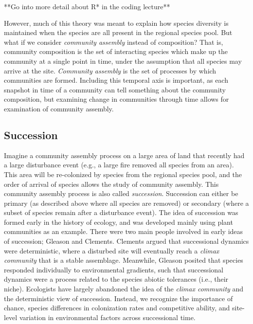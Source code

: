 \documentclass[12pt]{article}
\begin{document}
**Go into more detail about R* in the coding lecture**


However, much of this theory was meant to explain how species diversity is maintained when the species are all present in the regional species pool. But what if we consider \textit{community assembly} instead of composition? That is, community composition is the set of interacting species which make up the community at a single point in time, under the assumption that all species may arrive at the site. \textit{Community assembly} is the set of processes by which communities are formed. Including this temporal axis is important, as each snapshot in time of a community can tell something about the community composition, but examining change in communities through time allows for examination of community assembly. 











\clearpage
\subsection*{Succession}
Imagine a community assembly process on a large area of land that recently had a large disturbance event (e.g., a large fire removed all species from an area). This area will be re-colonized by species from the regional species pool, and the order of arrival of species allows the study of community assembly. This community assembly process is also called \textit{succession}. Succession can either be primary (as described above where all species are removed) or secondary (where a subset of species remain after a disturbance event). The idea of succession was formed early in the history of ecology, and was developed mainly using plant communities as an example. There were two main people involved in early ideas of succession; Gleason and Clements. Clements argued that successional dynamics were deterministic, where a disturbed site will eventually reach a \textit{climax community} that is a stable assemblage. Meanwhile, Gleason posited that species responded individually to environmental gradients, such that successional dynamics were a process related to the species abiotic tolerances (i.e., their niche). Ecologists have largely abandoned the idea of the \textit{climax community} and the deterministic view of succession. Instead, we recognize the importance of chance, species differences in colonization rates and competitive ability, and site-level variation in environmental factors across successional time. 
\end{document}
